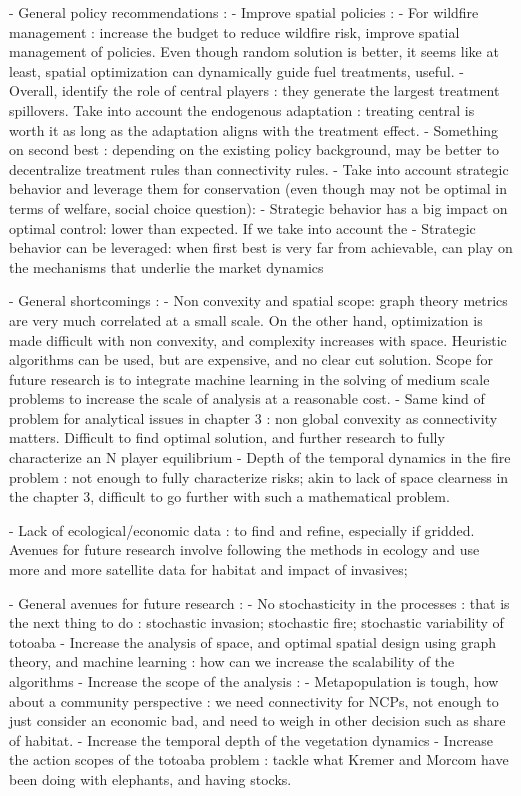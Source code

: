 - General policy recommendations : 
	- Improve spatial policies : 
		- For wildfire management : increase the budget to reduce wildfire risk, improve spatial management of policies. Even though random solution is better, it seems like at least, spatial optimization can dynamically guide fuel treatments, useful. 
		- Overall, identify the role of central players : they generate the largest treatment spillovers. Take into account the endogenous adaptation : treating central is worth it as long as the adaptation aligns with the treatment effect. 
		- Something on second best : depending on the existing policy background, may be better to decentralize treatment rules than connectivity rules. 
	- Take into account strategic behavior and leverage them for conservation (even though may not be optimal in terms of welfare, social choice question):
		- Strategic behavior has a big impact on optimal control: lower than expected. If we take into account the 
		- Strategic behavior can be leveraged: when first best is very far from achievable, can play on the mechanisms that underlie the market dynamics
	
- General shortcomings : 
	- Non convexity and spatial scope: graph theory metrics are very much correlated at a small scale. On the other hand, optimization is made difficult with non convexity, and complexity increases with space. Heuristic algorithms can be used, but are expensive, and no clear cut solution. Scope for future research is to integrate machine learning in the solving of medium scale problems to increase the scale of analysis at a reasonable cost. 	
	- Same kind of problem for analytical issues in chapter 3 : non global convexity as connectivity matters. Difficult to find optimal solution, and further research to fully characterize an N player equilibrium
	- Depth of the temporal dynamics in the fire problem : not enough to fully characterize risks; akin to lack of space clearness in the chapter 3, difficult to go further with such a mathematical problem. 

	- Lack of ecological/economic data : to find and refine, especially if gridded. Avenues for future research involve following the methods in ecology and use more and more satellite data for habitat and impact of invasives;

	
- General avenues for future research : 
	- No stochasticity in the processes : that is the next thing to do : stochastic invasion; stochastic fire; stochastic variability of totoaba
	- Increase the analysis of space, and optimal spatial design using graph theory, and machine learning : how can we increase the scalability of the algorithms
	- Increase the scope of the analysis : 
		- Metapopulation is tough, how about a community perspective : we need connectivity for NCPs, not enough to just consider an economic bad, and need to weigh in other decision such as share of habitat. 
		- Increase the temporal depth of the vegetation dynamics
		- Increase the action scopes of the totoaba problem : tackle what Kremer and Morcom have been doing with elephants, and having stocks. 

\clearpage
